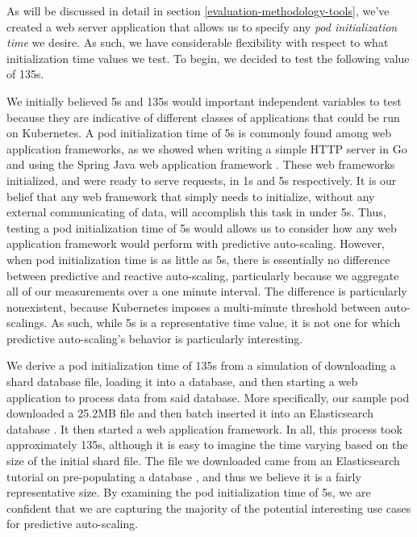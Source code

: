 As will be discussed in detail in section \ref{evaluation-methodology-tools},
we've created a web server application that allows us to specify any \textit{pod
initialization time} we desire. As such, we have considerable flexibility with
respect to what initialization time values we test. To begin, we decided to test the
following value of 135s.

We initially believed 5s and 135s would important independent variables to test because they
are indicative of different classes of applications that could be run on
Kubernetes. A pod initialization time of 5s is commonly found among web
application frameworks, as we showed when writing a simple HTTP server in Go and
using the Spring Java web application framework \cite{spring}. These web
frameworks initialized, and were ready to serve requests, in 1s and 5s
respectively. It is our belief that any web framework that simply
needs to initialize, without any external communicating of data, will
accomplish this task in under 5s. Thus, testing a pod initialization time of 5s
would allows us to consider how any web application framework would perform with
predictive auto-scaling. However, when pod initialization time is as little as
5s, there is essentially no difference between predictive and reactive
auto-scaling, particularly because we aggregate all of our measurements over a
one minute interval. The difference is particularly nonexistent, because
Kubernetes imposes a multi-minute threshold between auto-scalings.
As such, while 5s is a representative time value, it is not
one for which predictive auto-scaling's behavior is particularly interesting.

We derive a pod initialization time of 135s from a simulation of downloading a
shard database file, loading it into a database, and then starting a web
application to process data from said database. More specifically, our sample
pod downloaded a 25.2MB file and then batch inserted it into an Elasticsearch
database \cite{elasticsearch}. It then started a web application framework. In
all, this process took approximately 135s, although it is easy to imagine the
time varying based on the size of the initial shard file. The file we downloaded
came from an Elasticsearch tutorial on pre-populating a database
\cite{elasticsearch-import-some-data}, and thus we believe it is a fairly
representative size. By examining the pod initialization time of 5s, we
are confident that we are capturing the majority of the potential interesting use cases for
predictive auto-scaling.

